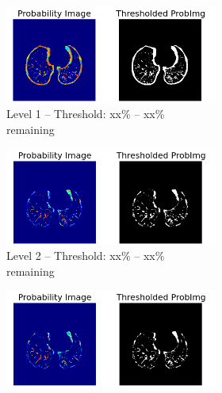\begin{figure}[p] %
\begin{center}
	\begin{subfigure}[b]{0.5\linewidth}
		\begin{subfigure}[b]{\linewidth}
			\includegraphics[width=\linewidth]{img/cascades/D50L1S50.png}
			\caption{Level 1 -- Threshold: xx\% -- xx\% remaining}
		\end{subfigure}
		\begin{subfigure}[b]{\linewidth}
			\includegraphics[width=\linewidth]{img/cascades/D50L2S50.png}
			\caption{Level 2 -- Threshold: xx\% -- xx\% remaining}
		\end{subfigure}
		\begin{subfigure}[b]{\linewidth}
			\includegraphics[width=\linewidth]{img/cascades/D50L3S50.png}

\end{subfigure}
\end{subfigure}
\end{center}
\end{figure}
